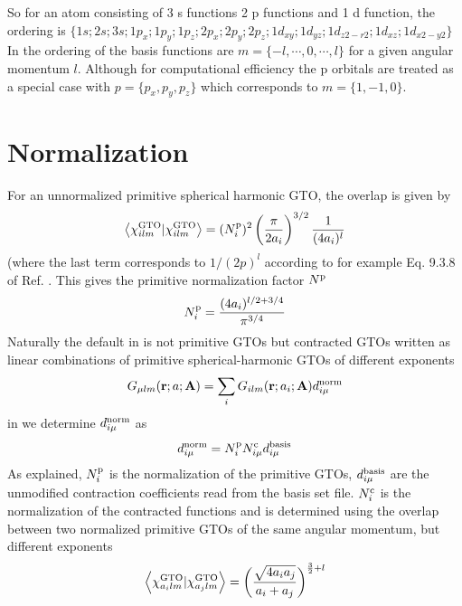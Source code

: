 So for an atom consisting of 3 s functions 2 p functions and 1 d function, the ordering is
$\{1s; 2s; 3s; 1p_{x};1p_{y};1p_{z}; 2p_{x};2p_{y};2p_{z}; 1d_{xy}; 1d_{yz}; 1d_{z2-r2} ; 1d_{xz}; 1d_{x2-y2}\}$
In {\lsdalton} the ordering of the basis functions are $m = \{-l,\cdots,0,\cdots,l\}$ for a given
angular momentum $l$. Although for computational efficiency the p orbitals are treated as a
special case with $p = \{ p_{x},p_{y},p_{z} \}$ which corresponds to $m = \{1,-1,0 \}$.

\section{Normalization}

For an unnormalized primitive spherical harmonic GTO, the overlap is given by
\begin{equation}
\left\langle \chi^{\text{GTO}}_{i lm} | \chi^{\text{GTO}}_{i lm} \right\rangle = (N_i^{\text{p}})^2 \left(\frac{\pi}{2a_i}\right)^{3/2}\frac{1}{(4a_i)^l}
\end{equation}
(where the last term corresponds to $1/(2p)^l$ according to for example Eq. 9.3.8 of Ref. \cite{MEST}. This gives 
the primitive normalization factor $N^{\text{p}}$
\begin{equation}
  N^{\text{p}}_i = \frac{(4a_i)^{l/2+3/4}}{\pi^{3/4}}
\end{equation}
Naturally the default in {\lsdalton} is not primitive GTOs but contracted GTOs written as linear combinations of primitive spherical-harmonic GTOs of different exponents
\begin{equation}
G_{\mu lm}(\textbf{r}; a;\textbf{A}) = \sum_{i} G_{ilm}(\textbf{r}; a_{i};\textbf{A})d^{\text{norm}}_{i\mu}
\end{equation}
in {\lsdalton} we determine $d^{\text{norm}}_{i\mu}$ as
\begin{equation}
d^{\text{norm}}_{i\mu} = N^{\text{p}}_{i}N^{\text{c}}_{i\mu}d^{\text{basis}}_{i\mu}
\end{equation}
As explained, $N^{\text{p}}_{i}$ is the normalization of the primitive GTOs, $d^{\text{basis}}_{i\mu}$ are the 
unmodified contraction coefficients read from the basis set file. $N^{\text{c}}_{i}$ is the normalization of the contracted functions and is determined using the overlap between two normalized primitive GTOs of the same angular momentum, but different exponents
\begin{eqnarray}
\left\langle \chi^{\text{GTO}}_{a_{i}lm} | \chi^{\text{GTO}}_{a_{j}lm} \right\rangle = \biggl( \frac{\sqrt{ 4 a_{i} a_{j}}}{a_{i}+a_{j}} \biggr)^{\frac{3}{2}+l}
\end{eqnarray}
